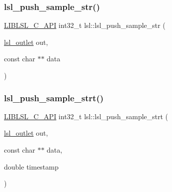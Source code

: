 \mbox{\label{namespacelsl_a3da2b3303768776977e0d621e2990c0e}} 
\subsubsection{\texorpdfstring{lsl\+\_\+push\+\_\+sample\+\_\+str()}{lsl\_push\_sample\_str()}}
{\footnotesize\ttfamily \hyperlink{lsl__cpp_8h_aafd0ef1813e8be84a1420c4f1df64615}{L\+I\+B\+L\+S\+L\+\_\+\+C\+\_\+\+A\+PI} int32\+\_\+t lsl\+::lsl\+\_\+push\+\_\+sample\+\_\+str (\begin{DoxyParamCaption}\item[{\hyperlink{namespacelsl_abcf512b0f66dacf86c10b165995fd50b}{lsl\+\_\+outlet}}]{out,  }\item[{const char $\ast$$\ast$}]{data }\end{DoxyParamCaption})}

\mbox{\label{namespacelsl_a634f8191b28e9cb9b6edcf01aaead377}} 
\subsubsection{\texorpdfstring{lsl\+\_\+push\+\_\+sample\+\_\+strt()}{lsl\_push\_sample\_strt()}}
{\footnotesize\ttfamily \hyperlink{lsl__cpp_8h_aafd0ef1813e8be84a1420c4f1df64615}{L\+I\+B\+L\+S\+L\+\_\+\+C\+\_\+\+A\+PI} int32\+\_\+t lsl\+::lsl\+\_\+push\+\_\+sample\+\_\+strt (\begin{DoxyParamCaption}\item[{\hyperlink{namespacelsl_abcf512b0f66dacf86c10b165995fd50b}{lsl\+\_\+outlet}}]{out,  }\item[{const char $\ast$$\ast$}]{data,  }\item[{double}]{timestamp }\end{DoxyParamCaption})}

\mbox{\label{namespacelsl_aeb9537e1d060020c99c47371b07bcb24}} 
